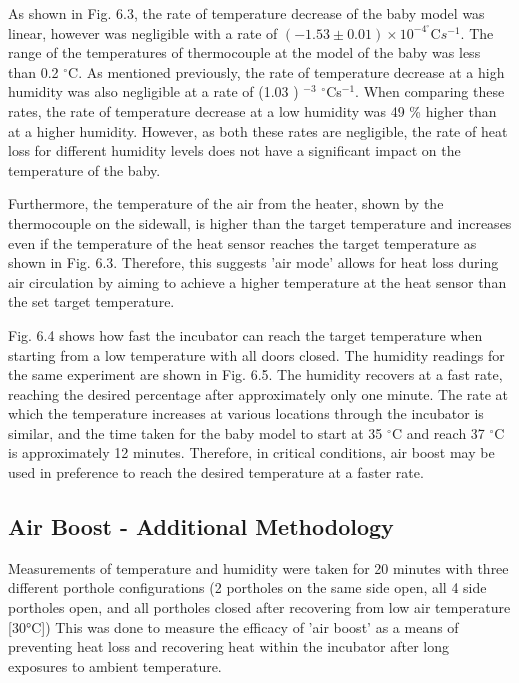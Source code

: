 \documentclass{article}
\begin{document}
\vspace{3mm}

As shown in Fig. 6.3, the rate of temperature decrease of the baby model was linear, however was negligible with a rate of $(-1.53 \pm 0.01) \times 10 ^{-4}^{\circ}$C$s^{-1}$. The range of the temperatures of thermocouple at the model of the baby was less than 0.2 $^{\circ}$C. As mentioned previously, the rate of temperature decrease at a high humidity was also negligible at a rate of (1.03 )  $^{-3}$ $^{\circ}$Cs$^{-1}$. When comparing these rates, the rate of temperature decrease at a low humidity was 49 \% higher than at a higher humidity. However, as both these rates are negligible, the rate of heat loss for different humidity levels does not have a significant impact on the temperature of the baby.

\vspace{3mm}

Furthermore, the temperature of the air from the heater, shown by the thermocouple on the sidewall, is higher than the target temperature and increases even if the temperature of the heat sensor reaches the target temperature as shown in Fig. 6.3. Therefore, this suggests 'air mode' allows for heat loss during air circulation by aiming to achieve a higher temperature at the heat sensor than the set target temperature.

\vspace{3mm}

Fig. 6.4 shows how fast the incubator can reach the target temperature when starting from a low temperature with all doors closed. The humidity readings for the same experiment are shown in Fig. 6.5. The humidity recovers at a fast rate, reaching the desired percentage after approximately only one minute. The rate at which the temperature increases at various locations through the incubator is similar, and the time taken for the baby model to start at 35 $^{\circ}$C and reach 37 $^{\circ}$C is approximately 12 minutes. Therefore, in critical conditions, air boost may be used in preference to reach the desired temperature at a faster rate. 

\subsection{Air Boost - Additional Methodology}

\vspace{3mm}



Measurements of temperature and humidity were taken for 20 minutes with three different porthole configurations (2 portholes on the same side open, all 4 side portholes open, and all portholes closed after recovering from low air temperature [30°C]) This was done to measure the efficacy of 'air boost' as a means of preventing heat loss and recovering heat within the incubator after long exposures to ambient temperature. 
\end{document}
